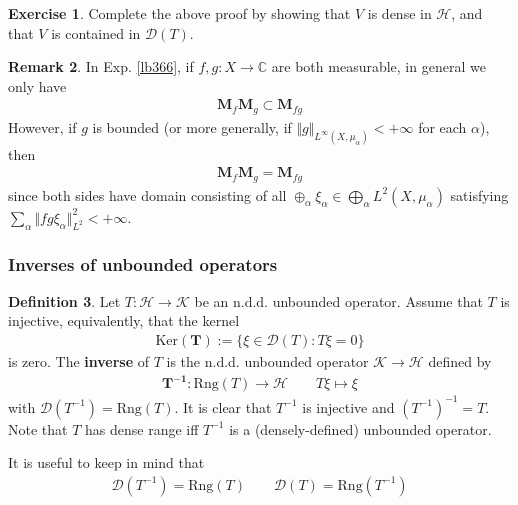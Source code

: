 \documentclass[12pt,b5paper,notitlepage]{article}
\theoremstyle{definition}
\newtheorem{df}{Definition}[subsection]
\newtheorem{exe}[df]{Exercise}
\newtheorem{rem}[df]{Remark}
\theoremstyle{plain}
\newcommand{\Dom}{\mathscr{D}}
\newcommand{\Cbb}{\mathbb C}
\newcommand{\Ker}{\mathrm{Ker}}
\newcommand{\Rng}{\mathrm{Rng}}
\newcommand{\MH}{\mathcal H}
\newcommand{\MK}{\mathcal K}
\newcommand{\Mbf}{\mathbf M}
\numberwithin{equation}{section}
\begin{document}
\begin{exe}
Complete the above proof by showing that $V$ is dense in $\MH$, and that $V$ is contained in $\Dom(T)$.
\end{exe}





\begin{rem}\label{lb371}
In Exp. \ref{lb366}, if $f,g:X\rightarrow\Cbb$ are both measurable, in general we only have
\begin{align*}
\Mbf_f\Mbf_g\subset\Mbf_{fg}
\end{align*}
However, if $g$ is bounded (or more generally, if $\Vert g\Vert_{L^\infty(X,\mu_\alpha)}<+\infty$ for each $\alpha$), then
\begin{align*}
\Mbf_f\Mbf_g=\Mbf_{fg}
\end{align*}
since both sides have domain consisting of all $\oplus_\alpha\xi_\alpha\in\bigoplus_\alpha L^2(X,\mu_\alpha)$ satisfying $\sum_\alpha\Vert fg\xi_\alpha\Vert_{L^2}^2<+\infty$.
\end{rem}



\subsubsection{Inverses of unbounded operators}


\begin{df}\label{lb377}
Let $T:\MH\rightarrow\MK$ be an n.d.d. unbounded operator. Assume that $T$ is injective, equivalently, that the kernel 
\begin{align*}
\pmb{\Ker(T)}:=\{\xi\in\Dom(T):T\xi=0\}
\end{align*}
is zero. The \textbf{inverse}  of $T$ is the n.d.d. unbounded operator $\MK\rightarrow\MH$ defined by
\begin{gather*}
\pmb{T^{-1}}:\Rng(T)\rightarrow\MH\qquad T\xi\mapsto \xi
\end{gather*}
with $\Dom(T^{-1})=\Rng(T)$. It is clear that $T^{-1}$ is injective and $(T^{-1})^{-1}=T$. Note that $T$ has dense range iff $T^{-1}$ is a (densely-defined) unbounded operator.
\end{df}

It is useful to keep in mind that
\begin{gather}
\Dom(T^{-1})=\Rng(T)\qquad \Dom(T)=\Rng(T^{-1})
\end{gather}
\end{document}
